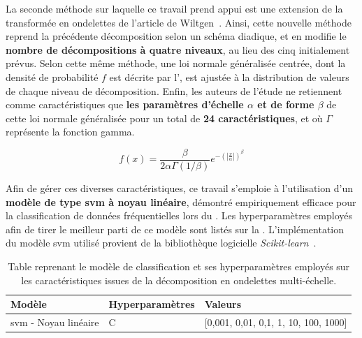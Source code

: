 La seconde méthode sur laquelle ce travail prend appui est une extension de la transformée en ondelettes de l'article de Wiltgen~. Ainsi, cette nouvelle méthode reprend la précédente décomposition selon un schéma diadique, et en modifie le \textbf{nombre de décompositions à quatre niveaux}, au lieu des cinq initialement prévus. Selon cette même méthode, une loi normale généralisée centrée, dont la densité de probabilité $f$ est décrite par l', est ajustée à la distribution de valeurs de chaque niveau de décomposition. Enfin, les auteurs de l'étude ne retiennent comme caractéristiques que \textbf{les paramètres d'échelle $\alpha$ et de forme $\beta$} de cette loi normale généralisée pour un total de \textbf{24 caractéristiques}, et où $\Gamma$ représente la fonction gamma.\par

\begin{equation}
    f(x)= \frac{\beta}{2\alpha\Gamma(1/\beta)} e^{-\left(|\frac{x}{\alpha}|\right)^\beta}
    \label{eq:image_improvement_ggd}
\end{equation}

Afin de gérer ces diverses caractéristiques, ce travail s'emploie à l'utilisation d'un \textbf{modèle de type \gls{svm} à noyau linéaire}, démontré empiriquement efficace pour la classification de données fréquentielles lors du . Les hyperparamètres employés afin de tirer le meilleur parti de ce modèle sont listés sur la . L'implémentation du modèle \gls{svm} utilisé provient de la bibliothèque logicielle \textit{Scikit-learn}~\cite{pedregosa2011}.\par

\begin{table}[H]
    \centering
    \begin{tabular}{lll}
        \toprule
        \textbf{Modèle}                                 & \textbf{Hyperparamètres}  & \textbf{Valeurs}                          \\ \midrule
        \gls{svm} - Noyau linéaire                      & C                         & [0,001, 0,01, 0,1, 1, 10, 100, 1000]      \\ 
        \bottomrule 
    \end{tabular} 
    \caption{Table reprenant le modèle de classification et ses hyperparamètres employés sur les caractéristiques issues de la décomposition en ondelettes multi-échelle.}
    \label{tab:parameters_image_improvement_multiscale_frequency}
\end{table}\par

